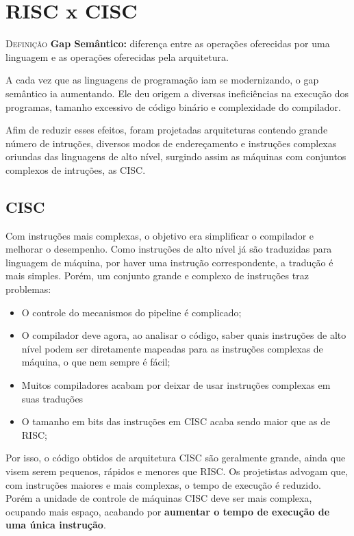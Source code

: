 \chapter{RISC x CISC}

\textsc{Definição} \textbf{Gap Semântico:} diferença entre as operações oferecidas por uma linguagem e as operações oferecidas pela arquitetura.

A cada vez que as linguagens de programação iam se modernizando, o gap semântico ia aumentando. Ele deu origem a diversas ineficiências na execução dos programas, tamanho excessivo de código binário e complexidade do compilador.

Afim de reduzir esses efeitos, foram projetadas arquiteturas contendo grande número de intruções, diversos modos de endereçamento e instruções complexas oriundas das linguagens de alto nível, surgindo assim as máquinas com conjuntos complexos de intruções, as CISC.

\section{CISC}
Com instruções mais complexas, o objetivo era simplificar o compilador e melhorar o desempenho. Como instruções de alto nível já são traduzidas para linguagem de máquina, por haver uma instrução correspondente, a tradução é mais simples. Porém, um conjunto grande e complexo de instruções traz problemas:
\begin{itemize}
  \item O controle do mecanismos do pipeline é complicado;

  \item O compilador deve agora, ao analisar o código, saber quais instruções de alto nível podem ser diretamente mapeadas para as instruções complexas de máquina, o que nem sempre é fácil;

  \item Muitos compiladores acabam por deixar de usar instruções complexas em suas traduções

  \item O tamanho em bits das instruções em CISC acaba sendo maior que as de RISC;

\end{itemize}

Por isso, o código obtidos de arquitetura CISC são geralmente grande, ainda que visem serem pequenos, rápidos e menores que RISC. Os projetistas advogam que, com instruções maiores e mais complexas, o tempo de execução é reduzido. Porém a unidade de controle de máquinas CISC deve ser mais complexa, ocupando mais espaço, acabando por \textbf{aumentar o tempo de execução de uma única instrução}.


